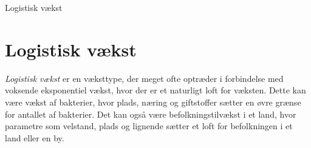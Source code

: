 \begin{center}
\Huge
Logistisk vækst
\end{center}


\section*{Logistisk vækst}

\textit{Logistisk vækst} er en væksttype, der meget ofte optræder i forbindelse med voksende eksponentiel vækst, hvor der er et naturligt loft for væksten. Dette kan være vækst af bakterier, hvor plads, næring og giftstoffer sætter en øvre grænse for antallet af bakterier. Det kan også være befolkningstilvækst i et land, hvor parametre som velstand, plads og lignende sætter et loft for befolkningen i et land eller en by. 

